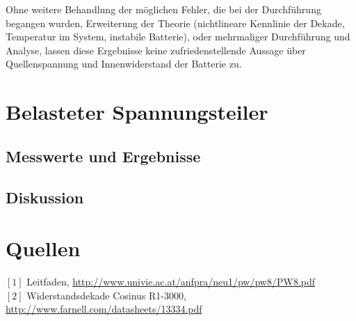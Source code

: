 \documentclass[12pt,a4paper]{article}
\begin{document}
\begin{multicols}{2}
Ohne weitere Behandlung der möglichen Fehler, die bei der Durchführung begangen wurden, Erweiterung der Theorie (nichtlineare Kennlinie der Dekade, Temperatur im System, instabile Batterie), oder mehrmaliger Durchführung und Analyse, lassen diese Ergebnisse keine zufriedenstellende Aussage über Quellenspannung und Innenwiderstand der Batterie zu.


\section{Belasteter Spannungsteiler}

\subsection{Messwerte und Ergebnisse}


\subsection{Diskussion}



\section{Quellen}
$[1]$ Leitfaden, \url{http://www.univie.ac.at/anfpra/neu1/pw/pw8/PW8.pdf}\\
$[2]$ Widerstandsdekade Cosinus R1-3000, \url{http://www.farnell.com/datasheets/13334.pdf}\\

\end{multicols}
\end{document}
